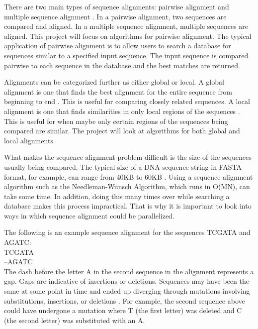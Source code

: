 \documentclass[conference]{IEEEtran}
\begin{document}
There are two main types of sequence alignments: pairwise alignment and multiple sequence alignment \cite{chaudhary_liu_matta_yang_2005}. In a pairwise alignment, two sequences are compared and aligned. In a multiple sequence alignment, multiple sequences are aligned. This project will focus on algorithms for pairwise alignment. The typical application of pairwise alignment is to allow users to search a database for sequences similar to a specified input sequence. The input sequence is compared pairwise to each sequence in the database and the best matches are returned.

Alignments can be categorized further as either global or local. A global alignment is one that finds the best alignment for the entire sequence from beginning to end \cite{global_alignment}. This is useful for comparing closely related sequences. A local alignment is one that finds similarities in only local regions of the sequences \cite{global_alignment}. This is useful for when maybe only certain regions of the sequences being compared are similar. The project will look at algorithms for both global and local alignments.

What makes the sequence alignment problem difficult is the size of the sequences usually being compared. The typical size of a DNA sequence string in FASTA format, for example, can range from 40KB to 60KB \cite{naveed_siddiqui_ahmed}. Using a sequence alignment algorithm such as the Needleman-Wunsch Algorithm, which runs in O(MN), can take some time. In addition, doing this many times over while searching a database makes this process impractical. That is why it is important to look into ways in which sequence alignment could be parallelized.

The following is an example sequence alignment for the sequences TCGATA and AGATC:\\

\hspace*{1em}TCGATA\\
\hspace*{2em}–AGATC\\

The dash before the letter A in the second sequence in the alignment represents a gap. Gaps are indicative of insertions or deletions. Sequences may have been the same at some point in time and ended up diverging through mutations involving substitutions, insertions, or deletions \cite{settles_2008}. For example, the second sequence above could have undergone a mutation where T (the first letter) was deleted and C (the second letter) was substituted with an A.
\end{document}
